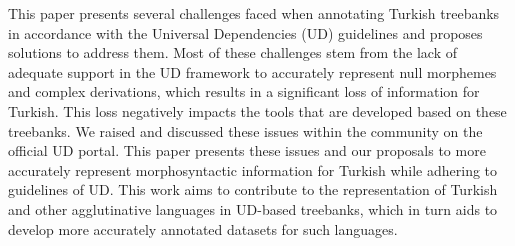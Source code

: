 This paper presents several challenges faced when annotating Turkish treebanks in accordance with the  Universal Dependencies (UD) guidelines and proposes solutions to address them. Most of these challenges stem from the lack of adequate support in the UD framework to accurately represent null morphemes and complex derivations, which results in a significant loss of information for Turkish. This loss negatively impacts the tools that are developed based on these treebanks. We raised and discussed these issues within the community on the official UD portal. This paper presents these issues and our proposals to more accurately represent morphosyntactic information for Turkish while adhering to guidelines of UD. This work aims to contribute to the representation of Turkish and other agglutinative languages in UD-based treebanks, which in turn aids to develop more accurately annotated datasets for such languages.
